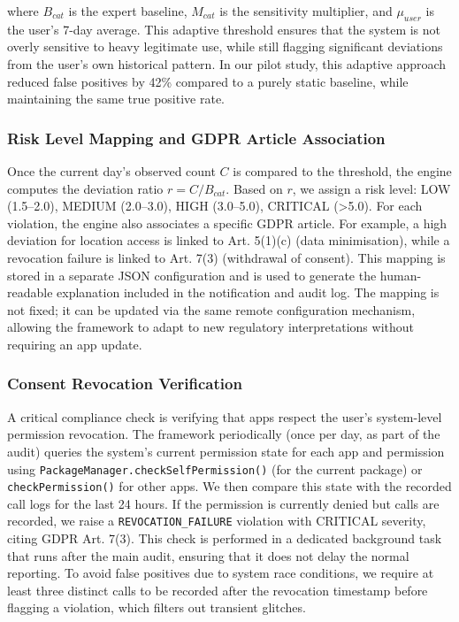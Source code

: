 where \(B_{cat}\) is the expert baseline, \(M_{cat}\) is the sensitivity multiplier, and \(\mu_{user}\) is the user's 7-day average. This adaptive threshold ensures that the system is not overly sensitive to heavy legitimate use, while still flagging significant deviations from the user's own historical pattern. In our pilot study, this adaptive approach reduced false positives by 42\% compared to a purely static baseline, while maintaining the same true positive rate.

\subsubsection{Risk Level Mapping and GDPR Article Association}

Once the current day's observed count \(C\) is compared to the threshold, the engine computes the deviation ratio \(r = C / B_{cat}\). Based on \(r\), we assign a risk level: LOW (1.5–2.0), MEDIUM (2.0–3.0), HIGH (3.0–5.0), CRITICAL (>5.0). For each violation, the engine also associates a specific GDPR article. For example, a high deviation for location access is linked to Art. 5(1)(c) (data minimisation), while a revocation failure is linked to Art. 7(3) (withdrawal of consent). This mapping is stored in a separate JSON configuration and is used to generate the human-readable explanation included in the notification and audit log. The mapping is not fixed; it can be updated via the same remote configuration mechanism, allowing the framework to adapt to new regulatory interpretations without requiring an app update.

\subsubsection{Consent Revocation Verification}

A critical compliance check is verifying that apps respect the user's system-level permission revocation. The framework periodically (once per day, as part of the audit) queries the system's current permission state for each app and permission using \texttt{PackageManager.checkSelfPermission()} (for the current package) or \texttt{checkPermission()} for other apps. We then compare this state with the recorded call logs for the last 24 hours. If the permission is currently denied but calls are recorded, we raise a \texttt{REVOCATION\_FAILURE} violation with CRITICAL severity, citing GDPR Art. 7(3). This check is performed in a dedicated background task that runs after the main audit, ensuring that it does not delay the normal reporting. To avoid false positives due to system race conditions, we require at least three distinct calls to be recorded after the revocation timestamp before flagging a violation, which filters out transient glitches.

